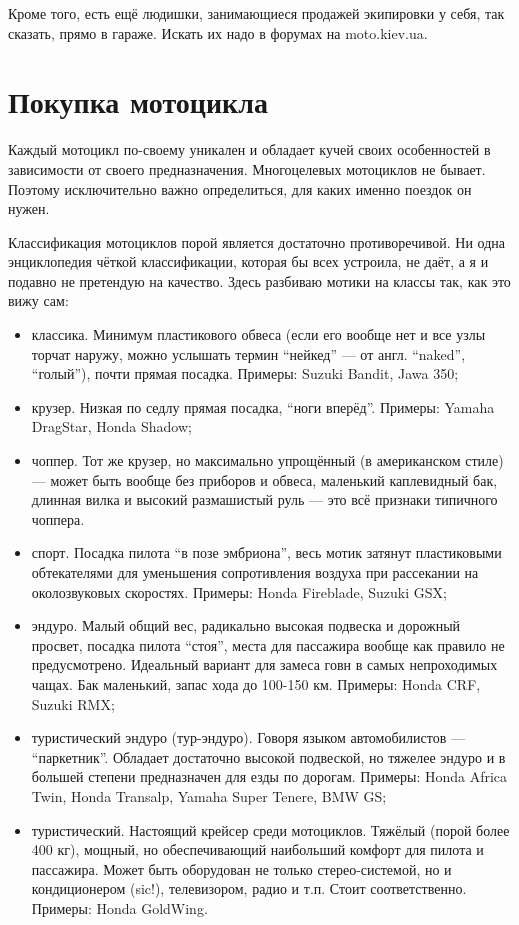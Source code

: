 \documentclass[12pt,a4paper]{article}
\begin{document}
Кроме того, есть ещё людишки, занимающиеся продажей экипировки у себя,
так сказать, прямо в гараже. Искать их надо в форумах на moto.kiev.ua.

\section{Покупка мотоцикла}

Каждый мотоцикл по-своему уникален и обладает кучей своих особенностей
в зависимости от своего предназначения. Многоцелевых мотоциклов не
бывает. Поэтому исключительно важно определиться, для каких именно
поездок он нужен.

Классификация мотоциклов порой является достаточно противоречивой.
Ни одна энциклопедия чёткой классификации, которая бы всех устроила,
не даёт, а я и подавно не претендую на качество. Здесь разбиваю
мотики на классы так, как это вижу сам:

\begin{itemize}
\item классика. Минимум пластикового обвеса (если его вообще нет и все
узлы торчат наружу, можно услышать термин ``нейкед'' --- от англ. ``naked'',
``голый''), почти прямая посадка. Примеры: Suzuki Bandit, Jawa 350;
\item крузер. Низкая по седлу прямая посадка, ``ноги вперёд''. Примеры:
Yamaha DragStar, Honda Shadow;
\item чоппер. Тот же крузер, но максимально упрощённый (в американском
стиле) --- может быть вообще без приборов и обвеса, маленький каплевидный
бак, длинная вилка и высокий размашистый руль --- это всё признаки
типичного чоппера.
\item спорт. Посадка пилота ``в позе эмбриона'', весь мотик затянут
пластиковыми обтекателями для уменьшения сопротивления воздуха при
рассекании на околозвуковых скоростях. Примеры: Honda Fireblade,
Suzuki GSX;
\item эндуро. Малый общий вес, радикально высокая подвеска и дорожный
просвет, посадка пилота ``стоя'', места для пассажира вообще как
правило не предусмотрено. Идеальный вариант для замеса говн в самых
непроходимых чащах. Бак маленький, запас хода до 100-150 км. Примеры:
Honda CRF, Suzuki RMX;
\item туристический эндуро (тур-эндуро). Говоря языком автомобилистов ---
``паркетник''. Обладает достаточно высокой подвеской, но тяжелее эндуро
и в большей степени предназначен для езды по дорогам. Примеры: Honda
Africa Twin, Honda Transalp, Yamaha Super Tenere, BMW GS;
\item туристический. Настоящий крейсер среди мотоциклов. Тяжёлый (порой
более 400 кг), мощный, но обеспечивающий наибольший комфорт для
пилота и пассажира. Может быть оборудован не только стерео-системой,
но и кондиционером (sic!), телевизором, радио и т.п. Стоит
соответственно. Примеры: Honda GoldWing.
\end{itemize}
\end{document}

